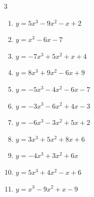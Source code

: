 


\setcounter{quesnum}{45}

\begin{multicols}{3}
\begin{enumerate}
  \itemsep=10pt
  \item $y=5x^{3}-9x^{2}-x+2$


  \item $y=x^{3}-6x-7$


  \item $y=-7x^{3}+5x^{2}+x+4$


  \item $y=8x^{3}+9x^{2}-6x+9$


  \item $y=-5x^{3}-4x^{2}-6x-7$


  \item $y=-3x^{3}-6x^{2}+4x-3$


  \item $y=-6x^{3}-3x^{2}+5x+2$


  \item $y=3x^{3}+5x^{2}+8x+6$


  \item $y=-4x^{3}+3x^{2}+6x$


  \item $y=5x^{3}+4x^{2}-x+6$


  \item $y=x^{3}-9x^{2}+x-9$



\end{enumerate}
\end{multicols}
